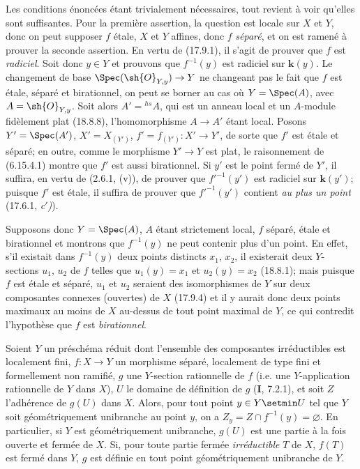 Les conditions énoncées étant trivialement nécessaires, tout revient à voir qu'elles sont suffisantes. Pour la première assertion, la question est locale sur $X$ et $Y$, donc on peut supposer $f$ étale, $X$ et $Y$ affines, donc $f$ \emph{séparé}, et on est ramené à prouver la seconde assertion. En vertu de (17.9.1), il s'agit de prouver que $f$ est \emph{radiciel}. Soit donc $y\in Y$ et prouvons que $f^{-1}(y)$ est radiciel sur $\boldsymbol{k}(y)$. Le changement de base $\Spec(\sh{O}_{Y,y})\to Y$ ne changeant pas le fait que $f$ est étale, séparé et birationnel, on peut se borner au cas où $Y=\Spec(A)$, avec $A=\sh{O}_{Y,y}$.
Soit alors $A'={}^{hs}\!A$, qui est un anneau local et un $A$-module
fidèlement plat (18.8.8), l'homomorphisme $A\to A'$ étant local. Posons $Y'=\Spec(A')$, $X'=X_{(Y')}$, $f'=f_{(Y')}:X'\to Y'$, de sorte que $f'$ est étale et séparé; en outre, comme le morphisme $Y'\to Y$ est plat, le raisonnement de (6.15.4.1) montre que $f'$ est aussi birationnel. Si $y'$ est le point fermé de $Y'$, il suffira, en vertu de (2.6.1, (v)), de prouver que $f'^{-1}(y')$ est radiciel sur $\boldsymbol{k}(y')$; puisque $f'$ est étale, il suffira de prouver que $f'^{-1}(y')$ contient \emph{au plus un point} (17.6.1, \emph{c$'$)}).

Supposons donc $Y=\Spec(A)$, $A$ étant strictement local, $f$ séparé, étale et birationnel et montrons que $f^{-1}(y)$ ne peut contenir plus d'un point. En effet, s'il existait dans $f^{-1}(y)$ deux points distincts $x_1$, $x_2$, il existerait deux $Y$-sections $u_1$, $u_2$ de $f$ telles que $u_1(y)=x_1$ et $u_2(y)=x_2$ (18.8.1); mais puisque $f$ est étale et séparé, $u_1$ et $u_2$ seraient des isomorphismes de $Y$ sur deux composantes connexes (ouvertes) de $X$ (17.9.4) et il y aurait donc deux points maximaux au moins de $X$ au-dessus de tout point maximal de $Y$, ce qui contredit l'hypothèse que $f$ est \emph{birationnel}.

\begin{proposition}[18.10.19]
\label{IV.18.10.19}
Soient $Y$ un préschéma réduit dont l'ensemble des composantes irréductibles est localement fini, $f:X\to Y$ un morphisme séparé, localement de type fini et formellement non ramifié, $g$ une $Y$-section rationnelle de $f$ \textup{(i.e.} une $Y$-application rationnelle de $Y$ dans $X$\textup{)}, $U$ le domaine de définition de $g$ \textup{(\textbf{I}, 7.2.1)}, et soit $Z$ l'adhérence de $g(U)$ dans $X$. Alors, pour tout point $y\in Y\setmin U$ tel que $Y$ soit géométriquement unibranche au point $y$, on a $Z_y=Z\cap f^{-1}(y)=\varnothing$. En particulier, si $Y$ est géométriquement unibranche, $g(U)$ est une partie à la fois ouverte et fermée de $X$. Si, pour toute partie fermée \emph{irréductible} $T$ de $X$, $f(T)$ est fermé dans $Y$, $g$ est définie en tout point géométriquement unibranche de $Y$.
\end{proposition}

